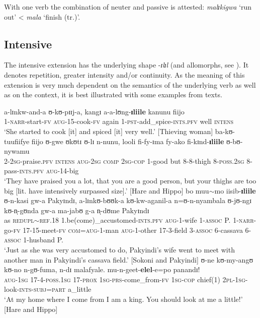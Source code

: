 With one verb the combination of neuter and passive is attested: \textit{malɪkigwa} \lq run out' < \textit{mala} \lq finish (tr.)'.%
\subsection{Intensive}
The intensive extension has the underlying shape -\textit{ɪlɪl} (and allomorphs, see ). It denotes repetition, greater intensity and/or continuity. As the meaning of this extension is very much dependent on the semantics of the underlying verb as well as on the context, it is best illustrated with some examples from texts.

\begin{exe}
\ex \gll a-lɪnkw-and-a ʊ-kʊ-pɪɪj-a, kangɪ a-a-lʊng-\textbf{ɪliile} kanunu fiijo\\
1-\textsc{narr}-start-\textsc{fv} \textsc{aug}-15-cook-\textsc{fv} again 1-\textsc{pst}-add\_spice-\textsc{ints.pfv} well \textsc{intens}\\
\glt `She started to cook [it] and spiced [it] very well.' [Thieving woman]
\ex \gll ba-kʊ-tuufiifye fiijo ʊ-gwe ʊkʊtɪ ʊ-lɪ n-nunu, looli fi-fy-ɪma fy-ako fi-kɪnd-\textbf{ɪliile} ʊ-bʊ-nywamu\\
2-\textsc{2sg}-praise.\textsc{pfv} \textsc{intens} \textsc{aug}-\textsc{2sg} \textsc{comp} \textsc{2sg}-\textsc{cop} 1-good but 8-8-thigh 8-\textsc{poss.2sg} 8-pass-\textsc{ints}.\textsc{pfv} \textsc{aug}-14-big\\
\glt `They have praised you a lot, that you are a good person, but your thighs are too big [lit. have intensively surpassed size].' [Hare and Hippo] %
\ex \gll bo muu$\sim$mo iisib-\textbf{ɪliile} ʊ-n-kasi gw-a Pakyɪndɪ, a-lɪnkʊ-bʊʊk-a kʊ-kw-aganil-a n=ʊ-n-nyambala ʊ-jʊ-ngɪ kʊ-n̩-gʊnda gw-a ma-jabʊ g-a n̩-dʊme Pakyɪndɪ\\
as \textsc{redupl}$\sim$\textsc{ref.18} 1.be(come)\_accustomed-\textsc{ints.pfv} \textsc{aug}-1-wife 1-\textsc{assoc} P. 1-\textsc{narr}-go-\textsc{fv} 17-15-meet-\textsc{fv} \textsc{com}=\textsc{aug}-1-man \textsc{aug}-1-other 17-3-field 3-\textsc{assoc} 6-cassava 6-\textsc{assoc} 1-husband P.\\
\glt `Just as she was very accustomed to do, Pakyindi's wife went to meet with another man in Pakyindi's cassava field.' [Sokoni and Pakyindi] 
\ex \gll ʊ-ne kʊ-my-angʊ kʊ-no n-gʊ-fuma, n-dɪ malafyale. mu-n-geet-\textbf{elel}-e=po panandɪ!\\
\textsc{aug}-\textsc{1sg} 17-4-\textsc{poss.1sg} 17-\textsc{prox} \textsc{1sg}-\textsc{prs}-come\_from-\textsc{fv} \textsc{1sg}-\textsc{cop} chief(1) \textsc{2pl}-\textsc{1sg}-look-\textsc{ints}-\textsc{subj}=\textsc{part} a\_little\\ 
\glt `At my home where I come from I am a king. You should look at me a little!' [Hare and Hippo]
\end{exe}

